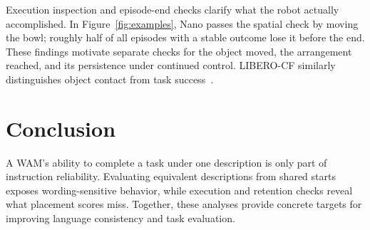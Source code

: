 \documentclass{article}
\begin{document}
Execution inspection and episode-end checks clarify what the robot actually accomplished. In Figure~\ref{fig:examples}, Nano passes the spatial check by moving the bowl; roughly half of all episodes with a stable outcome lose it before the end. These findings motivate separate checks for the object moved, the arrangement reached, and its persistence under continued control. LIBERO-CF similarly distinguishes object contact from task success~\citep{fang2026counterfactual}.

\section{Conclusion}
A WAM's ability to complete a task under one description is only part of instruction reliability. Evaluating equivalent descriptions from shared starts exposes wording-sensitive behavior, while execution and retention checks reveal what placement scores miss. Together, these analyses provide concrete targets for improving language consistency and task evaluation.

\clearpage

\end{document}
